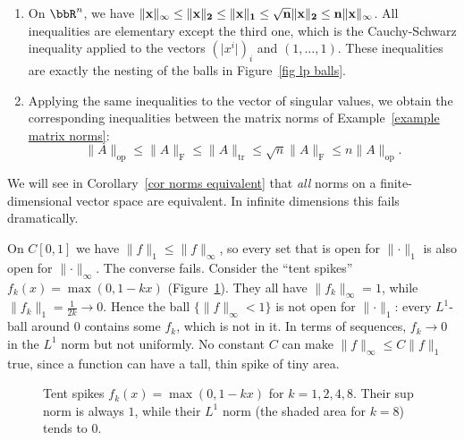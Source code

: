 \begin{example}\label{example equivalent norms}
    \begin{enumerate}
        \item On $\bbR^n$, we have $\lVert \bf{x}\rVert_\infty\leq\lVert \bf{x}\rVert_2\leq\lVert \bf{x}\rVert_1\leq\sqrt n\lVert \bf{x}\rVert_2\leq n\lVert \bf{x}\rVert_\infty$. All inequalities are elementary except the third one, which is the Cauchy-Schwarz inequality applied to the vectors $(\lvert x^i\rvert)_i$ and $(1,\ldots,1)$. These inequalities are exactly the nesting of the balls in Figure~\ref{fig lp balls}.
        \item Applying the same inequalities to the vector of singular values, we obtain the corresponding inequalities between the matrix norms of Example~\ref{example matrix norms}:
        \[\lVert A\rVert_{\mathrm{op}}\leq\lVert A\rVert_{\mathrm{F}}\leq\lVert A\rVert_{\mathrm{tr}}\leq\sqrt n\lVert A\rVert_{\mathrm{F}}\leq n\lVert A\rVert_{\mathrm{op}}.\]
    \end{enumerate}
    We will see in Corollary~\ref{cor norms equivalent} that \emph{all} norms on a finite-dimensional vector space are equivalent. In infinite dimensions this fails dramatically.
\end{example}

\begin{example}\label{example tent spikes}
    On $C[0,1]$ we have $\lVert f\rVert_1\leq\lVert f\rVert_\infty$, so every set that is open for $\lVert\cdot\rVert_1$ is also open for $\lVert\cdot\rVert_\infty$. The converse fails. Consider the ``tent spikes'' $f_k(x)=\max(0,1-kx)$ (Figure~\ref{fig tent spikes}). They all have $\lVert f_k\rVert_\infty=1$, while $\lVert f_k\rVert_1=\frac{1}{2k}\to0$. Hence the ball $\{\lVert f\rVert_\infty<1\}$ is not open for $\lVert \cdot\rVert_1$: every $L^1$-ball around $0$ contains some $f_k$, which is not in it. In terms of sequences, $f_k\to 0$ in the $L^1$ norm but not uniformly. No constant $C$ can make $\lVert f\rVert_\infty\leq C\lVert f\rVert_1$ true, since a function can have a tall, thin spike of tiny area.
\end{example}

\begin{figure}[tp]
    \centering
    \caption{Tent spikes $f_k(x)=\max(0,1-kx)$ for $k=1,2,4,8$. Their sup norm is always $1$, while their $L^1$ norm (the shaded area for $k=8$) tends to $0$.}
    \label{fig tent spikes}
\end{figure}


